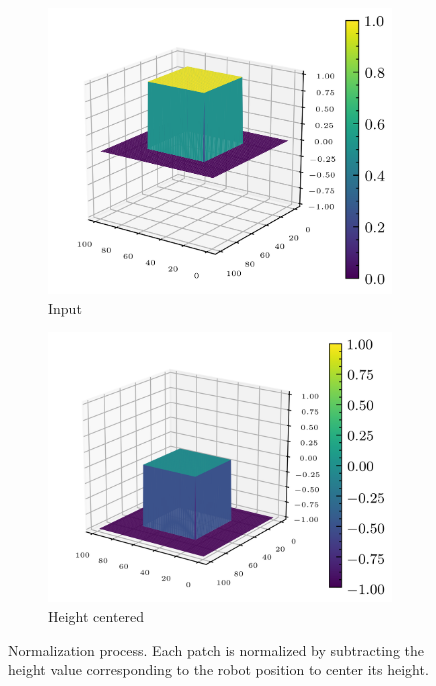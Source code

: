\documentclass[../document.tex]{subfiles}
\begin{document}
\begin{figure}[htbp]
          \begin{subfigure}[b]{0.32\textwidth}
        \includegraphics[width=\textwidth]{../img/data-aug/3d/square-middle.png}
        \caption{Input}
    \end{subfigure}
    \begin{subfigure}[b]{0.32\textwidth}
        \includegraphics[width=\textwidth]{../img/data-aug/3d/square-middle-center.png}
        \caption{Height centered}
    \end{subfigure}  
\caption{Normalization process. Each patch is normalized by subtracting the height value corresponding to the robot position to center its height. }
\label{fig: center}
\end{figure}
\end{document}
